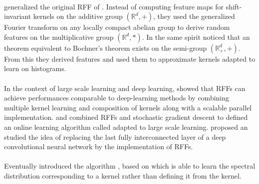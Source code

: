 \paragraph{}
 generalized the original \acs{RFF} of \citet{Rahimi2007}.
Instead of computing feature maps for shift-invariant kernels on the additive
group $(\mathbb{R}^d, +)$, they used the generalized Fourier transform on any
locally compact abelian group to derive random features on the multiplicative
group $(\mathbb{R}^d, *)$. In the same spirit \citet{yang2014random} noticed
that an theorem equivalent to Bochner's theorem exists on the semi-group
$(\mathbb{R}_+^d, +)$. From this they derived  features and
used them to approximate kernels adapted to learn on histograms.
\paragraph{}
In the context of large scale learning and deep learning, \citet{lu2014scale}
showed that \acsp{RFF} can achieve performances comparable to deep-learning
methods by combining multiple kernel learning and composition of kernels along
with a scalable parallel implementation.  and
\citet{xie2015scale} combined \acsp{RFF} and stochastic gradient descent to
defined an online learning algorithm called  adapted to large scale learning.  proposed an
studied the idea of replacing the last fully interconnected layer of a deep
convolutional neural network \citep{lecun1995convolutional} by the
 implementation of \acsp{RFF}.
\paragraph{}
Eventually \citet{Yang2015} introduced the algorithm , based
on  which is able to learn the spectral distribution
corresponding to a kernel rather than defining it from the kernel.

